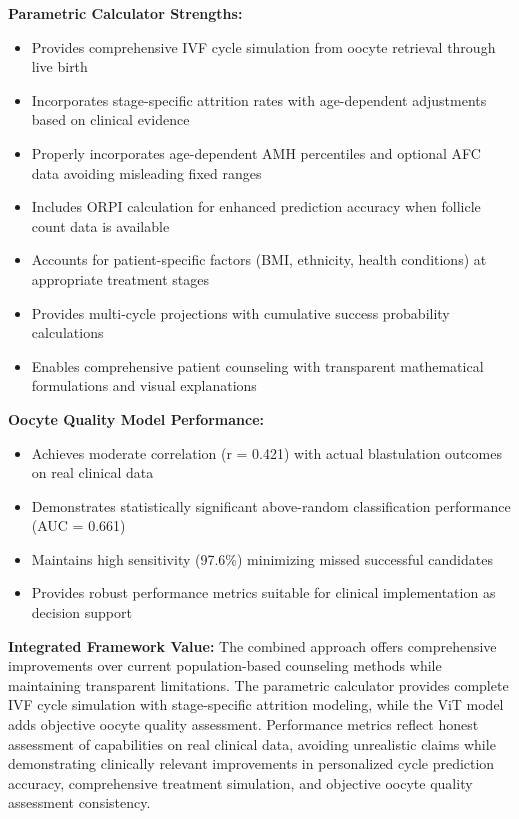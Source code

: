 \textbf{Parametric Calculator Strengths:}
\begin{itemize}
\item Provides comprehensive IVF cycle simulation from oocyte retrieval through live birth
\item Incorporates stage-specific attrition rates with age-dependent adjustments based on clinical evidence
\item Properly incorporates age-dependent AMH percentiles and optional AFC data avoiding misleading fixed ranges
\item Includes ORPI calculation for enhanced prediction accuracy when follicle count data is available
\item Accounts for patient-specific factors (BMI, ethnicity, health conditions) at appropriate treatment stages
\item Provides multi-cycle projections with cumulative success probability calculations
\item Enables comprehensive patient counseling with transparent mathematical formulations and visual explanations
\end{itemize}

\textbf{Oocyte Quality Model Performance:}
\begin{itemize}
\item Achieves moderate correlation (r = 0.421) with actual blastulation outcomes on real clinical data
\item Demonstrates statistically significant above-random classification performance (AUC = 0.661)
\item Maintains high sensitivity (97.6\%) minimizing missed successful candidates
\item Provides robust performance metrics suitable for clinical implementation as decision support
\end{itemize}

\textbf{Integrated Framework Value:}
The combined approach offers comprehensive improvements over current population-based counseling methods while maintaining transparent limitations. The parametric calculator provides complete IVF cycle simulation with stage-specific attrition modeling, while the ViT model adds objective oocyte quality assessment. Performance metrics reflect honest assessment of capabilities on real clinical data, avoiding unrealistic claims while demonstrating clinically relevant improvements in personalized cycle prediction accuracy, comprehensive treatment simulation, and objective oocyte quality assessment consistency.

